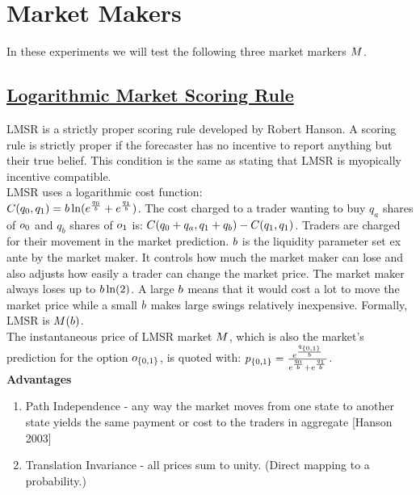 \section{Market Makers}
In these experiments we will test the following three market markers $M$.

\subsection{\href{http://mason.gmu.edu/~rhanson/mktscore.pdf}{Logarithmic Market Scoring Rule}}
LMSR is a strictly proper scoring rule developed by Robert Hanson. A scoring rule is strictly proper if the forecaster has no incentive to report anything but their true belief. This condition is the same as stating that LMSR is myopically incentive compatible.\\ 

LMSR uses a logarithmic cost function: \\
$C({q_0},{q_1}) = b\ln(e^{\frac{{q_0}}{b}} + e^{\frac{{q_1}}{b}})$. The cost charged to a trader wanting to buy $q_a$ shares of $o_0$ and $q_b$ shares of $o_1$ is: $C({q_0} + q_a, {q_1} + q_b) - C(q_1,{q_1})$. Traders are charged for their movement in the market prediction. $b$ is the liquidity parameter set ex ante by the market maker. It controls how much the market maker can lose and also adjusts how easily a trader can change the market price. The market maker always loses up to $b\ln(2)$. A large $b$ means that it would cost a lot to move the market price while a small $b$ makes large swings relatively inexpensive. Formally, LMSR is $M(b)$.\\

The instantaneous price of LMSR market $M$, which is also the market's prediction for the option $o_{\{0,1\}}$, is quoted with: $p_{\{0,1\}} = \frac{e^{\frac{q_{\{0,1\}}}{b}}}{e^{\frac{{q_0}}{b}} + e^{\frac{{q_1}}{b}}}$. \\

\textbf{Advantages}\\
\begin{enumerate}
\item{Path Independence - any way the market moves from one state to another state yields the same payment or cost to the traders in aggregate [Hanson 2003]}
\item{Translation Invariance - all prices sum to unity. (Direct mapping to a probability.)}
\end{enumerate}

